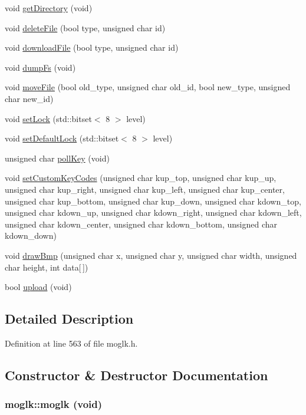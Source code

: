 \begin{CompactItemize}
\item 
void \hyperlink{classmoglk_06a6671f138121034a345e2cbd6497f8}{getDirectory} (void)
\item 
void \hyperlink{classmoglk_a1953b9ffbeb39433686cb30fe72cdab}{deleteFile} (bool type, unsigned char id)
\item 
void \hyperlink{classmoglk_f8a03d73de173bee806acf9d51cba608}{downloadFile} (bool type, unsigned char id)
\item 
void \hyperlink{classmoglk_7f929ca25d08f1c116cd43152b7373f3}{dumpFs} (void)
\item 
void \hyperlink{classmoglk_c2bcc785f03c46e32f27486704bd559a}{moveFile} (bool old\_\-type, unsigned char old\_\-id, bool new\_\-type, unsigned char new\_\-id)
\item 
void \hyperlink{classmoglk_a9d4351888605654a20b9d3e46160ce3}{setLock} (std::bitset$<$ 8 $>$ level)
\item 
void \hyperlink{classmoglk_1f658975ec72ee94a416e03b80d940ec}{setDefaultLock} (std::bitset$<$ 8 $>$ level)
\item 
unsigned char \hyperlink{classmoglk_7892be0a8494f02f08f57981d31932cd}{pollKey} (void)
\item 
void \hyperlink{classmoglk_fbe1a25a8d461d02dd84df8b7a8b796b}{setCustomKeyCodes} (unsigned char kup\_\-top, unsigned char kup\_\-up, unsigned char kup\_\-right, unsigned char kup\_\-left, unsigned char kup\_\-center, unsigned char kup\_\-bottom, unsigned char kup\_\-down, unsigned char kdown\_\-top, unsigned char kdown\_\-up, unsigned char kdown\_\-right, unsigned char kdown\_\-left, unsigned char kdown\_\-center, unsigned char kdown\_\-bottom, unsigned char kdown\_\-down)
\item 
void \hyperlink{classmoglk_38ad099b570c6f81d9a5ae6251ae77d1}{drawBmp} (unsigned char x, unsigned char y, unsigned char width, unsigned char height, int data\mbox{[}$\,$\mbox{]})
\item 
bool \hyperlink{classmoglk_a133809f7d934231f03f1d59fbc88f75}{upload} (void)
\end{CompactItemize}


\subsection{Detailed Description}


Definition at line 563 of file moglk.h.

\subsection{Constructor \& Destructor Documentation}
\hypertarget{classmoglk_3f753134676c7d36a96e6d4439cc0348}{
\subsubsection[{moglk}]{\setlength{\rightskip}{0pt plus 5cm}moglk::moglk (void)}}
\label{classmoglk_3f753134676c7d36a96e6d4439cc0348}




